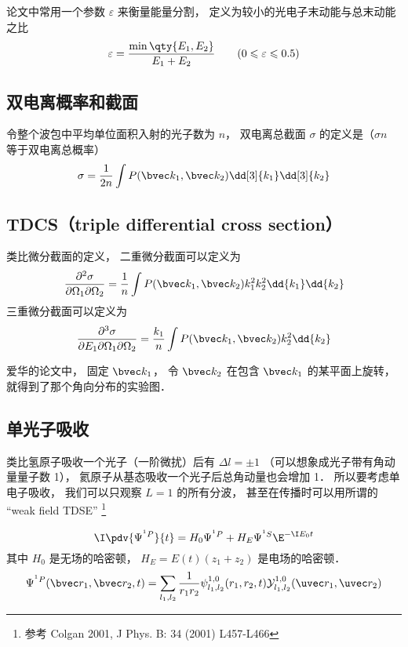 论文中常用一个参数 $\varepsilon$ 来衡量能量分割， 定义为较小的光电子末动能与总末动能之比
\begin{equation}
\varepsilon = \frac{\min\qty{E_1, E_2}}{E_1 + E_2} \qquad (0 \leqslant \varepsilon \leqslant 0.5)
\end{equation}

\subsection{双电离概率和截面}
令整个波包中平均单位面积入射的光子数为 $n$， 双电离总截面 $\sigma$ 的定义是（$\sigma n$ 等于双电离总概率）
\begin{equation}
\sigma = \frac{1}{2n} \int P(\bvec k_1, \bvec k_2)\dd[3]{k_1}\dd[3]{k_2}
\end{equation}

\subsection{TDCS（triple differential cross section）}
类比微分截面的定义， 二重微分截面可以定义为
\begin{equation}
\frac{\partial^2\sigma}{\partial\Omega_1\partial\Omega_2} = \frac{1}{n} \int P(\bvec k_1, \bvec k_2)k_1^2k_2^2\dd{k_1}\dd{k_2}
\end{equation}
三重微分截面可以定义为
\begin{equation}
\frac{\partial^3\sigma}{\partial E_1\partial\Omega_1\partial\Omega_2} = \frac{k_1}{n} \int P(\bvec k_1, \bvec k_2)k_2^2\dd{k_2}
\end{equation}

爱华的论文中， 固定 $\bvec k_1$， 令 $\bvec k_2$ 在包含 $\bvec k_1$ 的某平面上旋转， 就得到了那个角向分布的实验图．

\subsection{单光子吸收}

类比氢原子吸收一个光子（一阶微扰）后有 $\Delta l = \pm 1$ （可以想象成光子带有角动量量子数 1）， 氦原子从基态吸收一个光子后总角动量也会增加 1． 所以要考虑单电子吸收， 我们可以只观察 $L = 1$ 的所有分波， 甚至在传播时可以用所谓的 “weak field TDSE” \footnote{参考 Colgan 2001, J Phys. B: 34 (2001) L457-L466}

\begin{equation}
\I \pdv{\Psi^{^1P}}{t} = H_0 \Psi^{^1P} + H_E \Psi^{^1S} \E^{-\I E_0 t}
\end{equation}
其中 $H_0$ 是无场的哈密顿， $H_E = E(t) (z_1 + z_2)$ 是电场的哈密顿．
\begin{equation}
\Psi^{^1P}(\bvec r_1, \bvec r_2, t) = \sum_{l_1, l_2} \frac{1}{r_1 r_2} \psi_{l_1, l_2}^{1, 0} (r_1, r_2, t) \mathcal Y_{l_1, l_2}^{1, 0} (\uvec r_1, \uvec r_2)
\end{equation}

